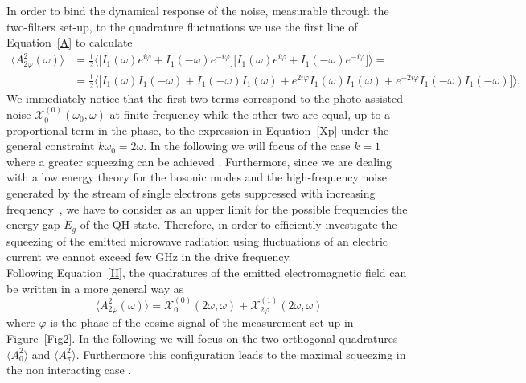 \documentclass[12pt]{iopart}
\begin{document}
In order to bind the dynamical response of the noise, measurable through the two-filters set-up, to the quadrature fluctuations we use the first line of Equation~\eqref{A} to calculate
\begin{equation}
\begin{split}
    \langle A^2_{2\varphi}(\omega)\rangle&=\frac{1}{2}\langle\bigg[I_1(\omega)e^{i\varphi}+I_1(-\omega)e^{-i\varphi}\bigg]\bigg[I_1(\omega)e^{i\varphi}+I_1(-\omega)e^{-i\varphi}\bigg]\rangle=\\
    &=\frac{1}{2}\langle\bigg[I_1(\omega)I_1(-\omega)+I_1(-\omega)I_1(\omega)+e^{2i\varphi}I_1(\omega)I_1(\omega)+e^{-2i\varphi}I_1(-\omega)I_1(-\omega)\bigg]\rangle .
    \label{II}
\end{split}
\end{equation}
We immediately notice that the first two terms correspond to the photo-assisted noise $\mathcal{X}_0^{(0)}(\omega_0,\omega)$ at finite frequency while the other two are equal, up to a proportional term in the phase, to the expression in Equation~\eqref{Xp} under the general constraint $k\omega_0=2\omega$. In the following we will focus of the case $k=1$ where a greater squeezing can be achieved \cite{Gasse13, Ferraro18}. Furthermore, since we are dealing with a low energy theory for the bosonic modes and the high-frequency noise generated by the stream of single electrons gets suppressed with increasing frequency~\cite{Parmentier12, Moskalets13}, we have to consider as an upper limit for the possible frequencies the energy gap $E_{g}$ of the QH state. Therefore, in order to efficiently investigate the squeezing of the emitted microwave radiation using fluctuations of an electric current we cannot exceed few GHz in the drive frequency.\\
Following Equation~\eqref{II}, the quadratures of the emitted electromagnetic field can be written in a more general way as
\begin{equation}
  \langle A^2_{2\varphi} (\omega)\rangle =\mathcal{X}_{0}^{(0)}(2\omega,\omega)+\mathcal{X}_{2\varphi}^{(1)}(2\omega,\omega)
    \label{phi}
\end{equation}
where $\varphi$ is the phase of the cosine signal of the measurement set-up in Figure~\ref{Fig2}.
In the following we will focus on the two orthogonal quadratures $\langle A^2_{0} \rangle$ and $\langle A^2_{\pi} \rangle$. Furthermore this configuration leads to the maximal squeezing in the non interacting case \cite{Gasse13}.
\end{document}
